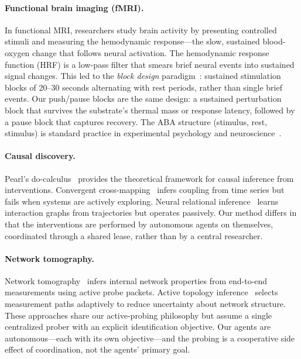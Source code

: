 \paragraph{Functional brain imaging (fMRI).}
In functional MRI, researchers study brain activity by presenting
controlled stimuli and measuring the hemodynamic response---the
slow, sustained blood-oxygen change that follows neural activation.
The hemodynamic response function (HRF) is a low-pass filter that
smears brief neural events into sustained signal changes. This led
to the \emph{block design} paradigm~\citep{friston1999fmri}:
sustained stimulation blocks of 20--30 seconds alternating with rest
periods, rather than single brief events. Our push/pause blocks are
the same design: a sustained perturbation block that survives the
substrate's thermal mass or response latency, followed by a pause
block that captures recovery. The ABA structure (stimulus, rest,
stimulus) is standard practice in experimental psychology and
neuroscience~\citep{box1978statistics}.

\paragraph{Causal discovery.}
Pearl's do-calculus~\citep{pearl2009causality} provides the
theoretical framework for causal inference from interventions.
Convergent cross-mapping~\citep{sugihara2012ccm} infers coupling
from time series but fails when systems are actively exploring.
Neural relational inference~\citep{kipf2018nri} learns interaction
graphs from trajectories but operates passively. Our method differs
in that the interventions are performed by autonomous agents on
themselves, coordinated through a shared lease, rather than by a
central researcher.

\paragraph{Network tomography.}
Network tomography~\citep{vardi1996tomography} infers internal
network properties from end-to-end measurements using active probe
packets. Active topology inference~\citep{coates2002tomography}
selects measurement paths adaptively to reduce uncertainty about
network structure. These approaches share our active-probing
philosophy but assume a single centralized prober with an explicit
identification objective. Our agents are autonomous---each with its
own objective---and the probing is a cooperative side effect of
coordination, not the agents' primary goal.
